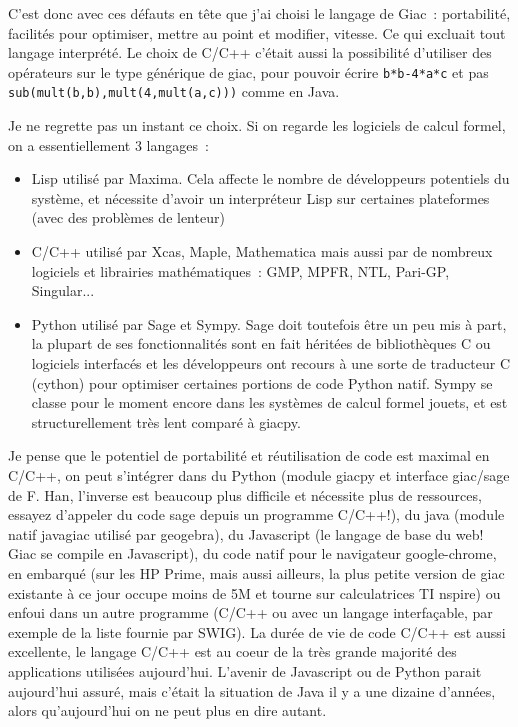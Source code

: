 \documentclass[a4paper,11pt]{article}
\begin{document}
C'est donc avec ces d\'efauts en t\^ete que j'ai choisi le
langage de Giac~: portabilit\'e, facilit\'es pour optimiser,
mettre au point et modifier, vitesse. Ce qui excluait
tout langage interpr\'et\'e. Le choix
de C/C++ c'\'etait aussi la possibilit\'e d'utiliser des op\'erateurs
sur le type g\'en\'erique de giac, pour pouvoir \'ecrire
\verb|b*b-4*a*c| et pas \verb|sub(mult(b,b),mult(4,mult(a,c)))|
comme en Java.

Je ne regrette pas un instant ce choix. Si on regarde les logiciels
de calcul formel, on a essentiellement 3 langages~:
\begin{itemize}
\item Lisp utilis\'e par Maxima. Cela affecte
le nombre de d\'eveloppeurs potentiels du syst\`eme,
et n\'ecessite d'avoir un interpr\'eteur Lisp sur
certaines plateformes (avec des probl\`emes de lenteur)
\item C/C++ utilis\'e par Xcas, Maple, Mathematica
mais aussi par de nombreux logiciels et librairies
math\'ematiques~: GMP, MPFR, NTL,
Pari-GP, Singular...
\item Python utilis\'e par Sage et Sympy. Sage doit toutefois
\^etre un peu mis \`a part, la plupart de ses fonctionnalit\'es
sont en fait h\'erit\'ees de biblioth\`eques C ou logiciels
interfac\'es et les d\'eveloppeurs ont recours \`a une
sorte de traducteur C (cython) pour optimiser certaines portions de code
Python natif. Sympy se classe pour le moment encore dans les
syst\`emes de calcul formel jouets,
et est structurellement tr\`es lent compar\'e \`a giacpy.
\end{itemize}
Je pense que le potentiel de portabilit\'e
et r\'eutilisation de code est maximal en C/C++,
on peut s'int\'egrer dans du Python (module giacpy
et interface giac/sage de F. Han, l'inverse est beaucoup plus difficile et
n\'ecessite plus de ressources, essayez d'appeler
du code sage depuis un programme C/C++!),
du java (module natif javagiac utilis\'e par geogebra),
du Javascript (le langage de base du web! Giac se compile en
Javascript),
du code natif pour le navigateur google-chrome,
en embarqu\'e (sur les HP Prime, mais aussi ailleurs,
la plus petite version de giac existante \`a ce jour
occupe moins de 5M et tourne sur calculatrices TI nspire) ou
enfoui dans un autre programme (C/C++ ou avec
un langage interfa\c{c}able, par exemple de la liste fournie par SWIG).
La dur\'ee de vie de code C/C++ est aussi excellente, le
langage C/C++ est au coeur de la tr\`es grande majorit\'e
des applications utilis\'ees aujourd'hui. L'avenir de Javascript
ou de Python parait aujourd'hui assur\'e, mais c'\'etait
la situation de Java il y a une dizaine d'ann\'ees, alors
qu'aujourd'hui on ne peut plus en dire autant.
\end{document}
